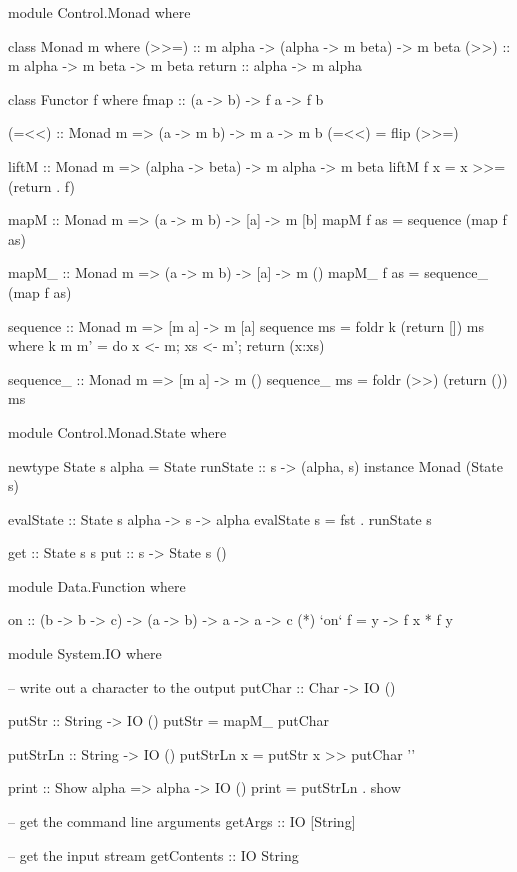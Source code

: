 \begin{code}
module Control.Monad where

class Monad m where
		(>>=) :: m alpha -> (alpha -> m beta) -> m beta
		(>>) :: m alpha -> m beta -> m beta
		return :: alpha -> m alpha

class Functor f where
	  fmap :: (a -> b) -> f a -> f b

(=<<) :: Monad m => (a -> m b) -> m a -> m b
(=<<) = flip (>>=)

liftM :: Monad m => (alpha -> beta) -> m alpha -> m beta
liftM f x = x >>= (return . f)

mapM            :: Monad m => (a -> m b) -> [a] -> m [b]
mapM f as       =  sequence (map f as)

mapM_           :: Monad m => (a -> m b) -> [a] -> m ()
mapM_ f as      =  sequence_ (map f as)

sequence       :: Monad m => [m a] -> m [a] 
sequence ms = foldr k (return []) ms
	where k m m' = do { x <- m; xs <- m'; return (x:xs) }

sequence_        :: Monad m => [m a] -> m () 
sequence_ ms     =  foldr (>>) (return ()) ms
\end{code}

\begin{code}
module Control.Monad.State where

newtype State s alpha = State {runState :: s -> (alpha, s)}
instance Monad (State s)

evalState :: State s alpha -> s -> alpha
evalState s = fst . runState s

get :: State s s
put :: s -> State s ()
\end{code}

\begin{code}
module Data.Function where

on :: (b -> b -> c) -> (a -> b) -> a -> a -> c
(*) `on` f = \x y -> f x * f y
\end{code}

\begin{code}
module System.IO where

-- write out a character to the output
putChar :: Char -> IO ()

putStr :: String -> IO ()
putStr = mapM_ putChar

putStrLn :: String -> IO ()
putStrLn x = putStr x >> putChar '\n'

print :: Show alpha => alpha -> IO ()
print = putStrLn . show

-- get the command line arguments
getArgs :: IO [String]

-- get the input stream
getContents :: IO String
\end{code}

